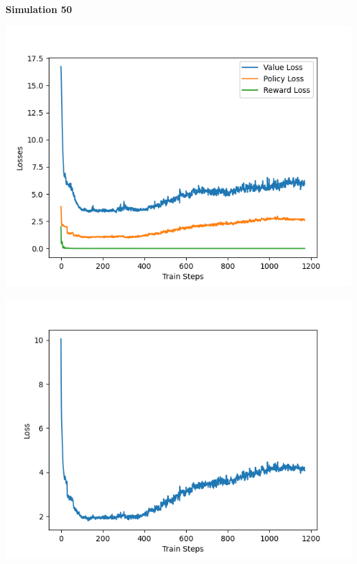 \documentclass[12pt]{article}
\begin{document}
\begin{tcolorbox}[height=45em, width=\textwidth]
\begin{center}
        \textbf{Simulation 50} \\
        \begin{minipage}{0.32\textwidth}
            \includegraphics[width=\textwidth]{outputs/plots/sim_50/training/individual_losses.png}
        \end{minipage}%
        \hfill%
        \begin{minipage}{0.32\textwidth}
            \includegraphics[width=\textwidth]{outputs/plots/sim_50/training/total_loss.png}
        \end{minipage}%
        \hfill%
        \begin{minipage}{0.32\textwidth}

\end{minipage}
\end{center}
\end{tcolorbox}
\end{document}
